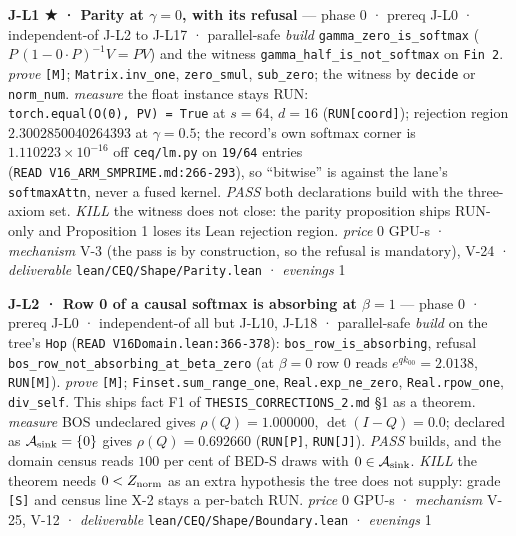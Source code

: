 \documentclass[11pt,a4paper]{article}
\theoremstyle{plain}
\theoremstyle{definition}
\theoremstyle{remark}
\begin{document}
\textbf{J-L1 ★ · Parity at \(\gamma=0\), with its refusal} --- phase 0 ·
prereq J-L0 · independent-of J-L2 to J-L17 · parallel-safe \emph{build}
\texttt{gamma\_zero\_is\_softmax} (\(P\,(1-0\cdot P)^{-1}V=PV\)) and the
witness \texttt{gamma\_half\_is\_not\_softmax} on \texttt{Fin\ 2}.
\emph{prove} \texttt{{[}M{]}}; \texttt{Matrix.inv\_one},
\texttt{zero\_smul}, \texttt{sub\_zero}; the witness by \texttt{decide}
or \texttt{norm\_num}. \emph{measure} the float instance stays RUN:
\texttt{torch.equal(O(0),\ PV)\ =\ True} at \(s=64\), \(d=16\)
(\texttt{RUN{[}coord{]}}); rejection region \(2.3002850040264393\) at
\(\gamma=0.5\); the record's own softmax corner is
\(1.110223\times10^{-16}\) off \texttt{ceq/lm.py} on \texttt{19/64}
entries (\texttt{READ\ V16\_ARM\_SMPRIME.md:266-293}), so ``bitwise'' is
against the lane's \texttt{softmaxAttn}, never a fused kernel.
\emph{PASS} both declarations build with the three-axiom set.
\emph{KILL} the witness does not close: the parity proposition ships
RUN-only and Proposition 1 loses its Lean rejection region. \emph{price}
\(0\) GPU-s · \emph{mechanism} V-3 (the pass is by construction, so the
refusal is mandatory), V-24 · \emph{deliverable}
\texttt{lean/CEQ/Shape/Parity.lean} · \emph{evenings} 1

\textbf{J-L2 · Row 0 of a causal softmax is absorbing at \(\beta=1\)}
--- phase 0 · prereq J-L0 · independent-of all but J-L10, J-L18 ·
parallel-safe \emph{build} on the tree's \texttt{Hop}
(\texttt{READ\ V16Domain.lean:366-378}):
\texttt{bos\_row\_is\_absorbing}, refusal
\texttt{bos\_row\_not\_absorbing\_at\_beta\_zero} (at \(\beta=0\) row 0
reads \(e^{qk_{00}}=2.0138\), \texttt{RUN{[}M{]}}). \emph{prove}
\texttt{{[}M{]}}; \texttt{Finset.sum\_range\_one},
\texttt{Real.exp\_ne\_zero}, \texttt{Real.rpow\_one},
\texttt{div\_self}. This ships fact F1 of
\texttt{THESIS\_CORRECTIONS\_2.md} §1 as a theorem. \emph{measure} BOS
undeclared gives \(\rho(Q)=1.000000\), \(\det(I-Q)=0.0\); declared as
\(\mathcal{A}_{\rm sink}=\{0\}\) gives \(\rho(Q)=0.692660\)
(\texttt{RUN{[}P{]}}, \texttt{RUN{[}J{]}}). \emph{PASS} builds, and the
domain census reads \(100\) per cent of BED-S draws with
\(0\in\mathcal{A}_{\rm sink}\). \emph{KILL} the theorem needs
\(0<Z_{\rm norm}\) as an extra hypothesis the tree does not supply:
grade \texttt{{[}S{]}} and census line X-2 stays a per-batch RUN.
\emph{price} \(0\) GPU-s · \emph{mechanism} V-25, V-12 ·
\emph{deliverable} \texttt{lean/CEQ/Shape/Boundary.lean} ·
\emph{evenings} 1
\end{document}
